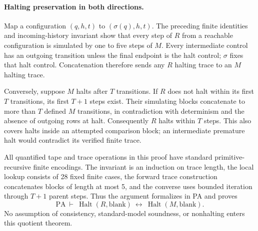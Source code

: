 \paragraph{Halting preservation in both directions.}
Map a configuration $(q,h,t)$ to $(\sigma(q),h,t)$.  The preceding finite
identities and incoming-history invariant show that every step of $R$
from a reachable configuration is simulated by one to five steps of $M$.
Every intermediate control has an outgoing transition unless the final
endpoint is the halt control; $\sigma$ fixes that halt control.
Concatenation therefore sends any $R$ halting trace to an $M$ halting
trace.

Conversely, suppose $M$ halts after $T$ transitions.  If $R$ does not halt
within its first $T$ transitions, its first $T+1$ steps exist.  Their
simulating blocks concatenate to more than $T$ defined $M$ transitions,
in contradiction with determinism and the absence of outgoing rows at
halt.  Consequently $R$ halts within $T$ steps.  This also covers halts
inside an attempted comparison block; an intermediate premature halt
would contradict its verified finite trace.

All quantified tape and trace operations in this proof have standard
primitive-recursive finite encodings.  The invariant is an induction on
trace length, the local lookup consists of 28 fixed finite cases, the
forward trace construction concatenates blocks of length at most 5, and
the converse uses bounded iteration through $T+1$ parent steps.  Thus the
argument formalizes in PA and proves
\[
 \mathrm{PA}\ \vdash\
 \operatorname{Halt}(R,\mathrm{blank})
 \ \leftrightarrow\
 \operatorname{Halt}(M,\mathrm{blank}).
\]
No assumption of consistency, standard-model soundness, or nonhalting
enters this quotient theorem.

